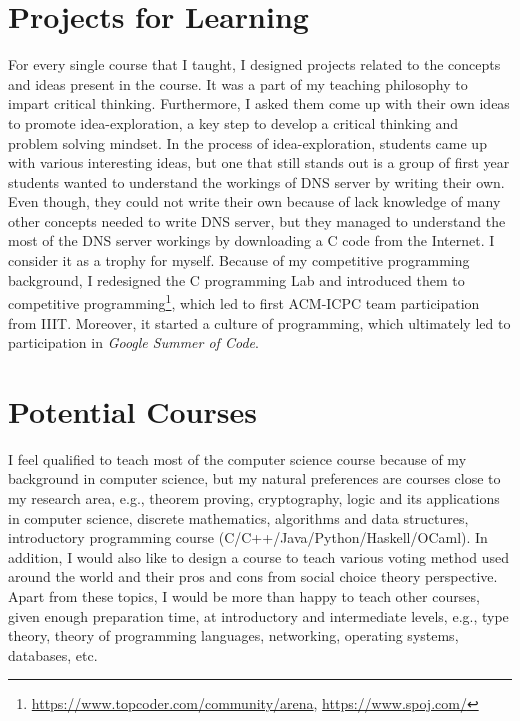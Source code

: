 \documentclass[a4paper]{article}
\begin{document}
\section{Projects for Learning}
For every single course that I taught, I designed projects related to the concepts 
and ideas present in the course. It was a part of my teaching philosophy to impart 
critical thinking. Furthermore, I asked them come up with their own ideas to 
promote idea-exploration, a key step to develop a critical thinking and problem solving mindset. 
In the process of idea-exploration, students came up with various interesting ideas, but 
one that still stands out is a group of first year students wanted to understand the workings of DNS server 
by writing their own. Even though, they could not write their own because of lack knowledge of many
other concepts needed to write DNS server, but they managed to understand the most of the 
DNS server workings by downloading a C code from the Internet. I consider it as a trophy 
for myself. Because of my competitive programming background, 
I redesigned the C programming Lab and introduced them to competitive 
programming\footnote{\url{https://www.topcoder.com/community/arena}, \url{https://www.spoj.com/}}, which led to first 
ACM-ICPC team participation from IIIT. Moreover, it started a culture 
of programming, which ultimately led to participation in \textit{Google Summer of Code}. 



\section{Potential Courses}
I feel qualified to teach most of the computer science course because of my background in computer science, but 
my natural preferences are courses close to my research area, e.g., theorem proving, cryptography, logic 
and its applications in computer science, discrete mathematics, algorithms and data structures, 
introductory programming course (C/C++/Java/Python/Haskell/OCaml).
In addition, I would also like to design a course to teach various voting method used around the world and 
their pros and cons from social choice theory perspective. Apart from these topics, I would 
be more than happy to teach other courses, given enough preparation time, at introductory and 
intermediate levels, e.g., type theory, theory of programming languages, 
networking, operating systems, databases, etc.
\end{document}
